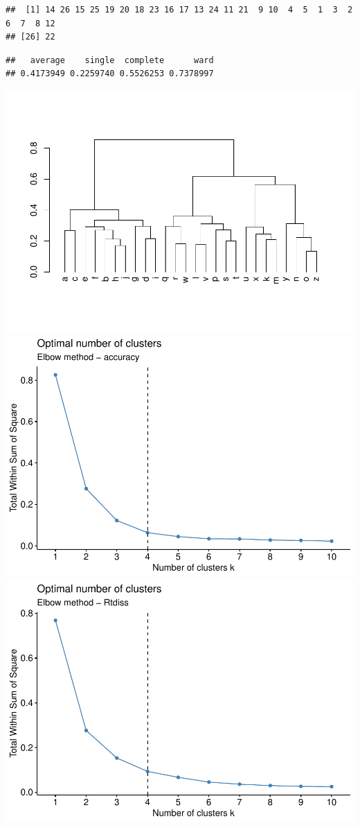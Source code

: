 \documentclass[
  english,
  man]{apa7}
\begin{document}
\begin{verbatim}
##  [1] 14 26 15 25 19 20 18 23 16 17 13 24 11 21  9 10  4  5  1  3  2  6  7  8 12
## [26] 22
\end{verbatim}

\begin{verbatim}
##   average    single  complete      ward 
## 0.4173949 0.2259740 0.5526253 0.7378997
\end{verbatim}

\includegraphics{BF_ms_1_files/figure-latex/Hierarchical clustering bl-2.pdf} \includegraphics{BF_ms_1_files/figure-latex/Hierarchical clustering bl-3.pdf} \includegraphics{BF_ms_1_files/figure-latex/Hierarchical clustering bl-4.pdf}
\end{document}
